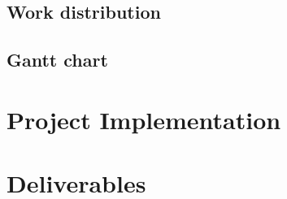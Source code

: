 \documentclass{article}
\begin{document}
\subsection{Work distribution}
\subsection{Gantt chart}

\section{Project Implementation}

\section{Deliverables}
\end{document}
